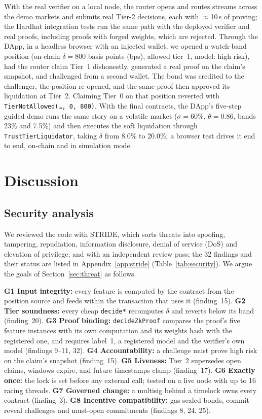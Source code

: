 \documentclass[sigconf,nonacm]{acmart}
\newcommand{\code}[1]{\texttt{\smaller #1}}
\begin{document}
With the real verifier on a local node, the router opens and routes streams across the demo markets and submits real Tier-2 decisions, each with $\approx$10\,s of proving; the Hardhat integration tests run the same path with the deployed verifier and real proofs, including proofs with forged weights, which are rejected. Through the DApp, in a headless browser with an injected wallet, we opened a watch-band position (on-chain $\delta=800$ basis points (bps), allowed tier~1, model: high risk), had the router claim Tier~1 dishonestly, generated a real proof on the claim's snapshot, and challenged from a second wallet. The bond was credited to the challenger, the position re-opened, and the same proof then approved its liquidation at Tier~2. Claiming Tier~0 on that position reverted with \code{TierNotAllowed(\dots, 0, 800)}. With the final contracts, the DApp's five-step guided demo runs the same story on a volatile market ($\sigma=60\%$, $\theta=0.86$, bands 23\% and 7.5\%) and then executes the soft liquidation through \code{TrustTierLiquidator}, taking $\delta$ from 8.0\% to 20.0\%; a browser test drives it end to end, on-chain and in simulation mode.

\section{Discussion}
\label{sec:discussion}

\subsection{Security analysis}
\label{sec:security}

We reviewed the code with STRIDE, which sorts threats into spoofing, tampering, repudiation, information disclosure, denial of service (DoS) and elevation of privilege, and with an independent review pass; the 32 findings and their status are listed in Appendix~\ref{app:stride} (Table~\ref{tab:security}). We argue the goals of Section~\ref{sec:threat} as follows.

\textbf{G1 Input integrity:} every feature is computed by the contract from the position source and feeds within the transaction that uses it (finding~15). \textbf{G2 Tier soundness:} every cheap \code{decide*} recomputes $\delta$ and reverts below its band (finding~20). \textbf{G3 Proof binding:} \code{decideZkProof} compares the proof's five feature instances with its own computation and its weights hash with the registered one, and requires label~1, a registered model and the verifier's own model (findings 9--11, 32). \textbf{G4 Accountability:} a challenge must prove high risk on the claim's snapshot (finding~15). \textbf{G5 Liveness:} Tier~2 supersedes open claims, windows expire, and future timestamps clamp (finding~17). \textbf{G6 Exactly once:} the lock is set before any external call; tested on a live node with up to 16 racing threads. \textbf{G7 Governed change:} a multisig behind a timelock owns every contract (finding~3). \textbf{G8 Incentive compatibility:} gas-scaled bonds, commit-reveal challenges and must-open commitments (findings 8, 24, 25).
\end{document}
